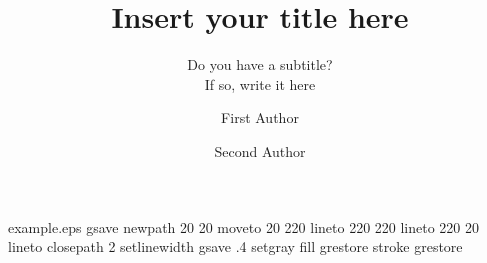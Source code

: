 %
%
%
%
%
\begin{filecontents*}{example.eps}
gsave
newpath
  20 20 moveto
  20 220 lineto
  220 220 lineto
  220 20 lineto
closepath
2 setlinewidth
gsave
  .4 setgray fill
grestore
stroke
grestore
\end{filecontents*}
%
\RequirePackage{fix-cm}
%
\documentclass[smallextended]{svjour3}       %
%
\usepackage{kotex}                           %

\smartqed  %
%
\usepackage{graphicx}
%
%
%
%
%


\title{Insert your title here%
}
\subtitle{Do you have a subtitle?\\ If so, write it here}


\author{First Author         \and
        Second Author %
}



